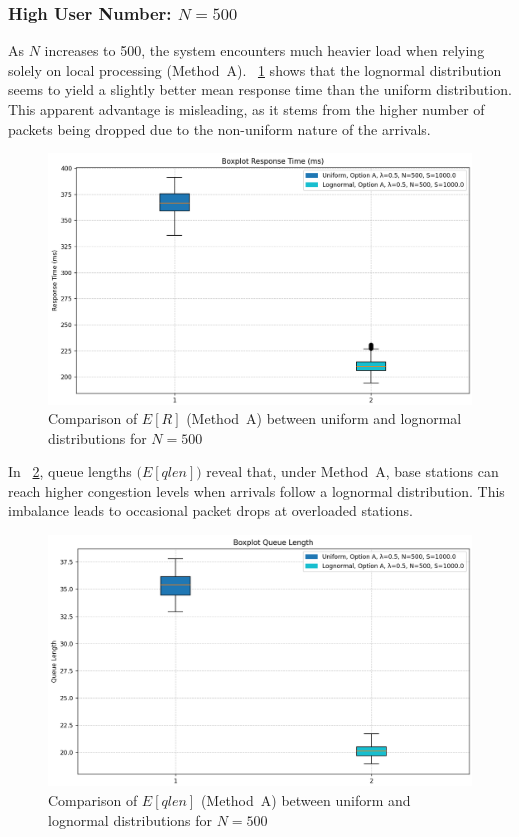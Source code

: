 \documentclass{report}
\begin{document}
\subsubsection{\textbf{High User Number: \(N = 500\)}}

As \(N\) increases to 500, the system encounters much heavier load when relying solely on local processing (Method~A). \figurename~\ref{fig:R_A_N500} shows that the lognormal distribution seems to yield a slightly better mean response time than the uniform distribution. This apparent advantage is misleading, as it stems from the higher number of packets being dropped due to the non-uniform nature of the arrivals. 

\begin{figure}[H]
    \centering
    \includegraphics[width=\textwidth]{img/plots/N-vary/R_A_N500.png}
    \caption{Comparison of \(E[R]\) (Method~A) between uniform and lognormal distributions for \(N = 500\)}
    \label{fig:R_A_N500}
\end{figure}

\begin{flushleft}
In \figurename~\ref{fig:Q_A_N500}, queue lengths \(\bigl(E[qlen]\bigr)\) reveal that, under Method~A, base stations can reach higher congestion levels when arrivals follow a lognormal distribution. This imbalance leads to occasional packet drops at overloaded stations.
\end{flushleft}

\begin{figure}[H]
    \centering
    \includegraphics[width=\textwidth]{img/plots/N-vary/Q_A_N500.png}
    \caption{Comparison of \(E[qlen]\) (Method~A) between uniform and lognormal distributions for \(N = 500\)}
    \label{fig:Q_A_N500}
\end{figure}
\end{document}

